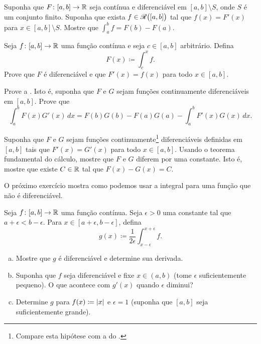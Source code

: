\begin{exercise}
Suponha que $F \colon [a,b] \to {\mathbb{R}}$ seja contínua e diferenciável
em $[a,b] \setminus S$, onde $S$ é um conjunto finito. Suponha que
exista $f \in {\mathscr{R}}\bigl([a,b]\bigr)$ tal que $f(x) = F'(x)$ para
$x \in [a,b] \setminus S$. Mostre que
$\int_a^b f = F(b)-F(a)$.
\end{exercise}

\begin{exercise} \label{secondftc:exercise}
Seja $f \colon [a,b] \to {\mathbb{R}}$ uma função contínua e seja $c \in [a,b]$
arbitrário. Defina
\begin{equation*}
F(x) \coloneqq \int_c^x f .
\end{equation*}
Prove que $F$ é diferenciável e que $F'(x) = f(x)$ para todo
$x \in [a,b]$.
\end{exercise}

\begin{exercise}
Prove a \emph{}. Isto é, suponha que $F$ e
$G$ sejam funções continuamente diferenciáveis em $[a,b]$. Prove que
\begin{equation*}
\int_a^b F(x)G'(x)\,dx
=
F(b)G(b)-F(a)G(a)
-
\int_a^b F'(x)G(x)\,dx .
\end{equation*}
\end{exercise}

\begin{exercise}
Suponha que $F$ e $G$ sejam funções continuamente\footnote{
Compare esta hipótese com a do .}
diferenciáveis definidas em $[a,b]$
tais que $F'(x) = G'(x)$ para todo $x \in [a,b]$.
Usando o teorema fundamental do cálculo,
mostre que $F$ e $G$ diferem por uma constante. Isto é, mostre que
existe $C \in {\mathbb{R}}$ tal que
$F(x)-G(x) = C$.
\end{exercise}

\begin{exnote}
O próximo exercício mostra como podemos usar a integral para  uma
função que não é diferenciável.
\end{exnote}

\begin{exercise} \label{exercise:smoothingout}
Seja $f \colon [a,b] \to {\mathbb{R}}$ uma função contínua. Seja $\epsilon > 0$
uma constante tal que $a+\epsilon < b-\epsilon$. Para $x \in [a+\epsilon,b-\epsilon]$, defina
\begin{equation*}
g(x) \coloneqq \frac{1}{2\epsilon} \int_{x-\epsilon}^{x+\epsilon} f .
\end{equation*}
\begin{enumerate}[a)]
\item
Mostre que $g$ é diferenciável e determine sua derivada.
\item
Suponha que $f$ seja diferenciável e fixe $x \in (a,b)$ (tome $\epsilon$
suficientemente pequeno). O que acontece com $g'(x)$ quando $\epsilon$ diminui?
\item
Determine $g$ para $f(x) \coloneqq \lvert {x} \rvert$ e $\epsilon = 1$ (suponha que
$[a,b]$ seja suficientemente grande).
\end{enumerate}
\end{exercise}

